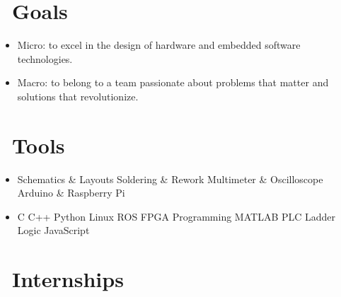 \documentclass{resume}
\begin{document}



\section{\faTrophy\ Goals}

\begin{itemize}[parsep=0.5ex]

  \item Micro: to excel in the design of hardware and embedded software technologies.
  
  \item Macro: to belong to a team passionate about problems that matter and solutions that revolutionize.
  
\end{itemize}

\section{\faWrench\ Tools}

\begin{itemize}[parsep=0.5ex]
  \item %
  Schematics \& Layouts\textperiodcentered
  Soldering \& Rework\textperiodcentered
  Multimeter \& Oscilloscope\textperiodcentered
  Arduino \& Raspberry Pi
  \hfill \faBolt

  \item %
  C\textperiodcentered 
  C++\textperiodcentered
  Python\textperiodcentered
  Linux\textperiodcentered
  ROS\textperiodcentered
  FPGA Programming\textperiodcentered
  MATLAB\textperiodcentered
  PLC Ladder Logic\textperiodcentered
  JavaScript%
  \hfill \faCode

\end{itemize}

\section{\faLineChart\ Internships}
\end{document}
